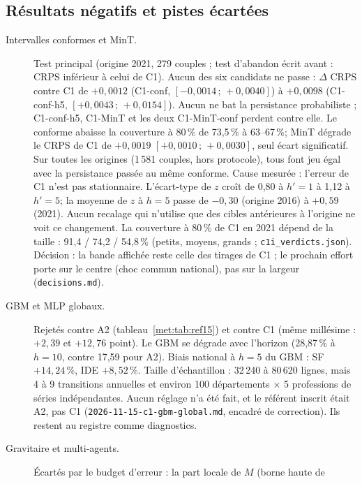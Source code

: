\subsection{Résultats négatifs et pistes écartées}
\label{met:negatifs}
\begin{description}
  \item[Intervalles conformes et MinT.] Test principal (origine 2021, 279 couples ; test d'abandon écrit
    avant : CRPS inférieur à celui de C1). Aucun des six candidats ne passe : $\Delta$ CRPS contre C1 de
    $+0{,}0012$ (C1-conf, $[-0{,}0014\,;\,+0{,}0040]$) à $+0{,}0098$ (C1-conf-h5,
    $[+0{,}0043\,;\,+0{,}0154]$)\mesure. Aucun ne bat la persistance probabiliste ; C1-conf-h5, C1-MinT et
    les deux C1-MinT-conf perdent contre elle\mesure. Le conforme abaisse la couverture à 80\,\% de
    73,5\,\% à 63--67\,\%\mesure ; MinT dégrade le CRPS de C1 de $+0{,}0019$
    $[+0{,}0010\,;\,+0{,}0030]$\mesure, seul écart significatif. Sur toutes les origines (1\,581 couples,
    hors protocole), tous font jeu égal avec la persistance passée au même conforme\mesure. Cause
    mesurée : l'erreur de C1 n'est pas stationnaire. L'écart-type de $z$ croît de 0,80 à $h' = 1$ à 1,12
    à $h' = 5$\mesure ; la moyenne de $z$ à $h = 5$ passe de $-0{,}30$ (origine 2016) à $+0{,}59$ (2021)\mesure.
    Aucun recalage qui n'utilise que des cibles antérieures à l'origine ne voit ce changement. La
    couverture à 80\,\% de C1 en 2021 dépend de la taille : 91,4 / 74,2 / 54,8\,\%\mesure{} (petits,
    moyens, grands ; \texttt{c1i\_verdicts.json}). Décision : la bande affichée reste celle des tirages de
    C1 ; le prochain effort porte sur le centre (choc commun national), pas sur la largeur
    (\texttt{decisions.md}).
  \item[GBM et MLP globaux.] Rejetés contre A2 (tableau~\ref{met:tab:ref15}) et contre C1 (même millésime :
    $+2{,}39$ et $+12{,}76$\derive{} point). Le GBM se dégrade avec l'horizon (28,87\,\%\mesure{} à
    $h = 10$, contre 17,59 pour A2). Biais national à $h = 5$ du GBM : SF $+14{,}24$\,\%\mesure, IDE
    $+8{,}52$\,\%\mesure. Taille d'échantillon : 32\,240 à 80\,620\mesure{} lignes, mais 4 à 9\mesure{}
    transitions annuelles et environ 100 départements $\times$ 5 professions de séries indépendantes\derive.
    Aucun réglage n'a été fait, et le référent inscrit était A2, pas C1 (\texttt{2026-11-15-c1-gbm-global.md},
    encadré de correction). Ils restent au registre comme diagnostics.
  \item[Gravitaire et multi-agents.] Écartés par le budget d'erreur : la part locale de $M$ (borne haute de

\end{description}
